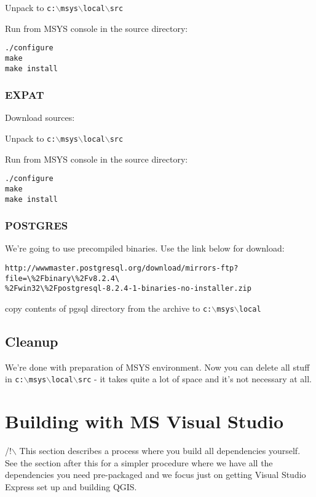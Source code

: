 Unpack to \texttt{c:$\backslash$msys$\backslash$local$\backslash$src}

Run from MSYS console in the source directory:

\begin{verbatim}
./configure
make
make install
\end{verbatim}

\subsubsection{EXPAT}
Download sources:

	\begin{quotation}
	\end{quotation}

Unpack to \texttt{c:$\backslash$msys$\backslash$local$\backslash$src}

Run from MSYS console in the source directory:

\begin{verbatim}
./configure
make
make install
\end{verbatim}

\subsubsection{POSTGRES}
We're going to use precompiled binaries. Use the link below for download:

\begin{verbatim}
http://wwwmaster.postgresql.org/download/mirrors-ftp?file=\%2Fbinary\%2Fv8.2.4\
%2Fwin32\%2Fpostgresql-8.2.4-1-binaries-no-installer.zip
\end{verbatim}

copy contents of pgsql directory from the archive to \texttt{c:$\backslash$msys$\backslash$local}

\subsection{Cleanup}
We're done with preparation of MSYS environment. Now you can delete all stuff in \texttt{c:$\backslash$msys$\backslash$local$\backslash$src} - it takes quite a lot
of space and it's not necessary at all.


\section{Building with MS Visual Studio}
/!$\backslash$ This section describes a process where you build all dependencies yourself. See the section
after this for a simpler procedure where we have all the dependencies you need pre-packaged
and we focus just on getting Visual Studio Express set up and building QGIS.

